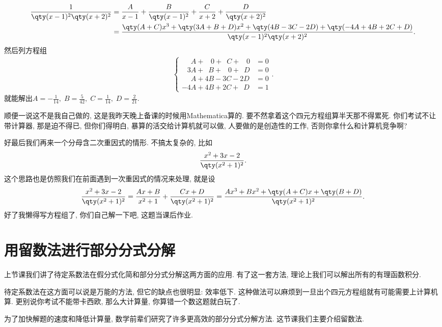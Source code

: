 \documentclass{ctexbook}
\begin{document}
{\begin{align*}
\frac{1}{\qty(x-1)^{2}\qty(x+2)^{2}}={}&\frac{A}{x-1}+\frac{B}{\qty(x-1)^{2}}+\frac{C}{x+2}+\frac{D}{\qty(x+2)^{2}}\\
={}&\frac{\qty(A+C)x^{3}+\qty(3A+B+D)x^{2}+\qty(4B-3C-2D)+\qty(-4A+4B+2C+D)}{\qty(x-1)^{2}\qty(x+2)^{2}}
.\end{align*}
然后列方程组
\begin{align*}
\begin{cases}
\;\;\;\;\,A+\;\;\;0+\;\:C+\;\;\;0&=0\\
\;\;\:3A+\;\:B+\;\;\:0+\;\:D&=0\\
\;\;\;\;\,A+4B-3C-2D&=0\\
-4A+4B+2C+\;\:D&=1
\end{cases}
.\end{align*}
就能解出$A=-\frac{1}{14},\;B=\frac{5}{42},\;C=\frac{1}{14},\;D=\frac{2}{21}$. \par
顺便一说这不是我自己做的, 这是我昨天晚上备课的时候用Mathematica算的. 要不然拿着这个四元方程组算半天那不得累死. 你们考试不让带计算器, 那是迫不得已, 但你们得明白, 暴算的活交给计算机就可以做, 人要做的是创造性的工作, 否则你拿什么和计算机竞争啊? \par
好最后我们再来一个分母含二次重因式的情形. 不搞太复杂的, 比如
\begin{align*}
\frac{x^{2}+3x-2}{\qty(x^{2}+1)^{2}}
.\end{align*}
这个思路也是仿照我们在前面遇到一次重因式的情况来处理, 就是设
\begin{align*}
\frac{x^{2}+3x-2}{\qty(x^{2}+1)^{2}}=\frac{Ax+B}{x^{2}+1}+\frac{Cx+D}{\qty(x^{2}+1)^{2}}=\frac{Ax^{3}+Bx^{2}+\qty(A+C)x+\qty(B+D)}{\qty(x^{2}+1)^{2}}
.\end{align*}
好了我懒得写方程组了, 你们自己解一下吧, 这题当课后作业. \par
\section{用留数法进行部分分式分解}
上节课我们讲了待定系数法在假分式化简和部分分式分解这两方面的应用. 有了这一套方法, 理论上我们可以解出所有的有理函数积分. \par
待定系数法在这方面可以说是万能的方法, 但它的缺点也很明显: 效率低下. 这种做法可以麻烦到一旦出个四元方程组就有可能需要上计算机算. 更别说你考试不能带卡西欧, 那么大计算量, 你算错一个数这题就白玩了. \par
为了加快解题的速度和降低计算量, 数学前辈们研究了许多更高效的部分分式分解方法. 这节课我们主要介绍留数法. \par
}
\end{document}
